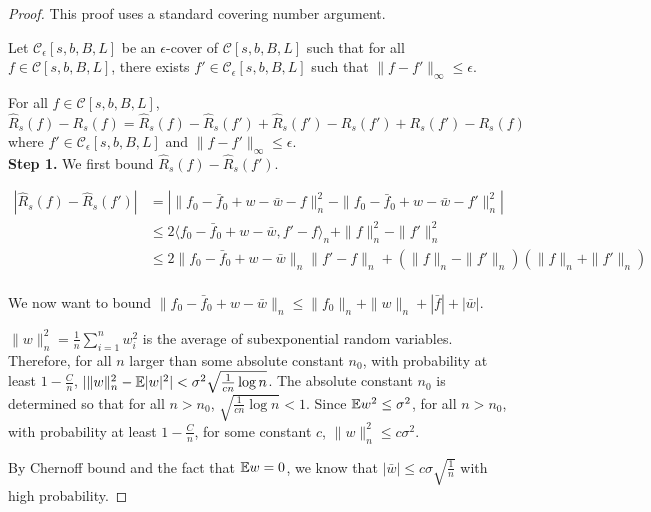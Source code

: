 \begin{proof}
This proof uses a standard covering number argument.

Let $\mathcal{C}_\epsilon[s,b,B,L]$ be an $\epsilon$-cover of $\mathcal{C}[s,b,B,L]$ such that for all $f \in \mathcal{C}[s,b,B,L]$, there exists $f' \in \mathcal{C}_\epsilon[s,b,B,L]$ such that $\| f - f'\|_\infty \leq \epsilon$.

For all $f \in \mathcal{C}[s,b,B,L]$,
\[
\hat{R}_s(f) - R_s(f) = \hat{R}_s(f) - \hat{R}_s(f') + \hat{R}_s(f') - R_s(f') + R_s(f') - R_s(f)
\]
where $f' \in \mathcal{C}_\epsilon[s,b,B,L]$ and $\| f - f' \|_\infty \leq \epsilon$.\\

\textbf{Step 1.} We first bound $\hat{R}_s(f) - \hat{R}_s(f')$.

\begin{align*}
|\hat{R}_s(f) - \hat{R}_s(f')| &= |\| f_0 - \bar{f}_0 + w - \bar{w} - f \|_n^2 
                                - \| f_0 - \bar{f}_0 + w -\bar{w} - f' \|_n^2| \\
	&\leq 2 \langle f_0 - \bar{f}_0 + w -\bar{w}, f' - f \rangle_n 
                            + \| f \|_n^2 - \| f' \|_n^2\\
	&\leq 2 \| f_0 - \bar{f}_0 + w -\bar{w} \|_n \| f' 
                   - f \|_n + ( \| f \|_n - \|f'\|_n)( \| f \|_n + \|f'\|_n)\\
\end{align*}

We now want to bound $\| f_0 - \bar{f}_0 + w -\bar{w} \|_n \leq \| f_0 \|_n  + \|w \|_n + |\bar{f}| + |\bar{w}|$.

$\| w \|^2_n = \frac{1}{n}\sum_{i=1}^n w_i^2$ is the average of subexponential random variables. Therefore, for all $n$ larger than some absolute constant $n_0$, with probability at least $1-\frac{C}{n}$, $|\|w\|^2_n - {\mathbb E}|w|^2 | < \sigma^2 \sqrt{\frac{1}{cn} \log n}$. The absolute constant $n_0$ is determined so that for all $n > n_0$, $\sqrt{\frac{1}{cn} \log n} < 1$. Since ${\mathbb E} w^2 \leq \sigma^2$, for all $n > n_0$, with probability at least $1 - \frac{C}{n}$, for some constant $c$, $\| w \|^2_n \leq c \sigma^2$.

By Chernoff bound and the fact that ${\mathbb E} w = 0$, we know that $|\bar{w}| \leq c \sigma \sqrt{\frac{1}{n}}$ with high probability.



\end{proof}
